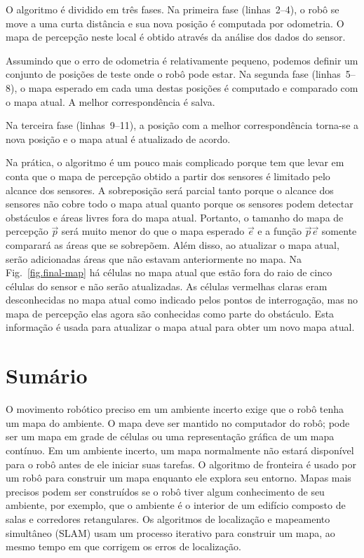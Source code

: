O algoritmo é dividido em três fases. Na primeira fase (linhas~2--4), o robô se move a uma curta distância e sua nova posição é computada por odometria. O mapa de percepção neste local é obtido através da análise dos dados do sensor.

Assumindo que o erro de odometria é relativamente pequeno, podemos definir um conjunto de posições de teste onde o robô pode estar. Na segunda fase (linhas~5--8), o mapa esperado em cada uma destas posições é computado e comparado com o mapa atual. A melhor correspondência é salva.

Na terceira fase (linhas~9--11), a posição com a melhor correspondência torna-se a nova posição e o mapa atual é atualizado de acordo.

Na prática, o algoritmo é um pouco mais complicado porque tem que levar em conta que o mapa de percepção obtido a partir dos sensores é limitado pelo alcance dos sensores. A sobreposição será parcial tanto porque o alcance dos sensores não cobre todo o mapa atual quanto porque os sensores podem detectar obstáculos e áreas livres fora do mapa atual. Portanto, o tamanho do mapa de percepção $\vec{p}$ será muito menor do que o mapa esperado $\vec{e}$ e a função $\vec{p}$\p{,}$\vec{e}$\p{)} somente comparará as áreas que se sobrepõem. Além disso, ao atualizar o mapa atual, serão adicionadas áreas que não estavam anteriormente no mapa. Na Fig.~\ref{fig.final-map} há células no mapa atual que estão fora do raio de cinco células do sensor e não serão atualizadas. As células vermelhas claras eram desconhecidas no mapa atual como indicado pelos pontos de interrogação, mas no mapa de percepção elas agora são conhecidas como parte do obstáculo. Esta informação é usada para atualizar o mapa atual para obter um novo mapa atual.

\section{Sumário}

O movimento robótico preciso em um ambiente incerto exige que o robô tenha um mapa do ambiente. O mapa deve ser mantido no computador do robô; pode ser um mapa em grade de células ou uma representação gráfica de um mapa contínuo. Em um ambiente incerto, um mapa normalmente não estará disponível para o robô antes de ele iniciar suas tarefas. O algoritmo de fronteira é usado por um robô para construir um mapa enquanto ele explora seu entorno. Mapas mais precisos podem ser construídos se o robô tiver algum conhecimento de seu ambiente, por exemplo, que o ambiente é o interior de um edifício composto de salas e corredores retangulares. Os algoritmos de localização e mapeamento simultâneo (SLAM) usam um processo iterativo para construir um mapa, ao mesmo tempo em que corrigem os erros de localização.

